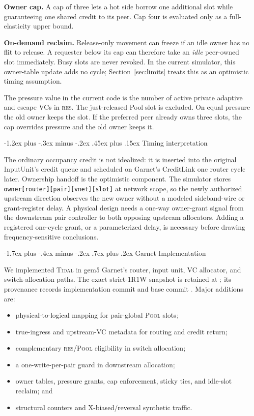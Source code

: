 \documentclass[10pt,twocolumn]{article}
\makeatletter
\newcommand{\system}{\textsc{Tidal}\xspace}
\newcommand{\res}{\textsc{res}\xspace}
\newcommand{\pool}{\textsc{Pool}\xspace}
\renewcommand\section{\@startsection{section}{1}{\z@}%
  {-1.7ex plus -.4ex minus -.2ex}%
  {.7ex plus .2ex}%
  {\normalfont\large\bfseries}}
\renewcommand\subsection{\@startsection{subsection}{2}{\z@}%
  {-1.2ex plus -.3ex minus -.2ex}%
  {.45ex plus .15ex}%
  {\normalfont\normalsize\bfseries}}
\makeatother
\begin{document}
\textbf{Owner cap.} A cap of three lets a hot side borrow one additional slot
while guaranteeing one shared credit to its peer. Cap four is evaluated only
as a full-elasticity upper bound.

\textbf{On-demand reclaim.} Release-only movement can freeze if an idle owner
has no flit to release. A requester below its cap can therefore take an
\emph{idle} peer-owned slot immediately. Busy slots are never revoked. In the
current simulator, this owner-table update adds no cycle; Section~\ref{sec:limits}
treats this as an optimistic timing assumption.

The pressure value in the current code is the number of active private
adaptive and escape VCs in \res. The just-released Pool slot is excluded.
On equal pressure the old owner keeps the slot. If the preferred peer already
owns three slots, the cap overrides pressure and the old owner keeps it.

\subsection{Timing interpretation}
\label{sec:timing}

The ordinary occupancy credit is not idealized: it is inserted into the
original InputUnit's credit queue and scheduled on Garnet's CreditLink one
router cycle later. Ownership handoff is the optimistic component. The
simulator stores \texttt{owner[router][pair][vnet][slot]} at network scope, so
the newly authorized upstream direction observes the new owner without a
modeled sideband-wire or grant-register delay. A physical design needs a
one-way owner-grant signal from the downstream pair controller to both
opposing upstream allocators. Adding a registered one-cycle grant, or a
parameterized delay, is necessary before drawing frequency-sensitive
conclusions.

\section{Garnet Implementation}

We implemented \system in gem5 Garnet's router, input unit, VC allocator, and
switch-allocation paths. The exact strict-1R1W snapshot is retained at
; its provenance records implementation commit
 and base commit . Major additions are:
\begin{itemize}
  \setlength{\itemsep}{0pt}
  \setlength{\topsep}{2pt}
  \item physical-to-logical mapping for pair-global \pool slots;
  \item true-ingress and upstream-VC metadata for routing and credit return;
  \item complementary \res/\pool eligibility in switch allocation;
  \item a one-write-per-pair guard in downstream allocation;
  \item owner tables, pressure grants, cap enforcement, sticky ties, and
  idle-slot reclaim; and
  \item structural counters and X-biased/reversal synthetic traffic.
\end{itemize}
\end{document}
